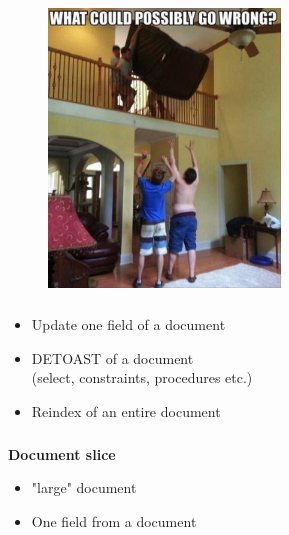 \documentclass[usenames,dvipsnames, 18pt, compress, aspectratio=169]{beamer}
\begin{document}
\begin{frame}
    \frametitle{}
    \begin{center}
    \begin{figure}
        \includegraphics[width=0.55\textwidth,center]{wrong.jpg}
    \end{figure}
    \end{center}
\end{frame}

\begin{frame}
    \frametitle{}
    \begin{center}
        \begin{itemize}[label={\MVRightarrow}]
            \item Update one field of a document
            \item DETOAST of a document\\
                (select, constraints, procedures etc.)
            \item Reindex of an entire document
        \end{itemize}
    \end{center}
\end{frame}

\begin{frame}
    \frametitle{}
    \begin{center}
        \textbf{Document slice}
        \begin{itemize}[label={}]
            \item "large" document
            \item One field from a document
        \end{itemize}
    \end{center}
\end{frame}
\end{document}
